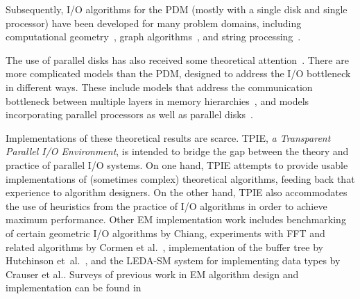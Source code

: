 Subsequently, I/O algorithms for the PDM (mostly with a
single disk and single processor) have been developed for
many problem domains, including computational
geometry~\cite{aapv-fibld-01,goodrich:external,arge:buffer,arge:theory,arge:gis,aamvv-empgbtag97,arge:interval,kanellakis:indexing,ramaswamy:path,subramanian:p-range,vengroff:efficient,agarwal:efficient,zhu:further,agarwal:point,arge:scalable,arge:theory,callahan:topology,franciosa:orders,grossi:cross-tree,arge:tpie},
 graph
algorithms~\cite{chiang:external,arge:buffer,kumar:improved,abello:functional,crauser:randomized,arge:obdd,feuerstein:memory,nodine:blocking,ullman:input},
 and string
processing~\cite{ferragina:fully,ferragina:fast,arge:strings,crauser:construction}.

The use of parallel disks
 has also received
some theoretical
attention~\cite{vitter:parmem1,nodine:deterministic,nodine:greed,dehne:efficient,dehne:reducing}.
There are more complicated models than the PDM, designed to
address the I/O bottleneck in different ways. These include
models that address the communication bottleneck between
multiple layers in
memory hierarchies~\cite{}, and models incorporating
parallel processors as well as parallel
disks~\cite{cormen:challenge,dehne:efficient,dehne:reducing}.

Implementations of these theoretical results are scarce.
TPIE, {\em a Transparent Parallel I/O Environment}, is
intended to bridge the gap between the theory and practice
of parallel I/O systems. On one hand, TPIE attempts to
provide usable implementations of (sometimes complex)
theoretical algorithms, feeding back that experience to
algorithm designers. On the other hand, TPIE also
accommodates the use of heuristics from the practice of I/O
algorithms in order to achieve maximum performance. Other EM
implementation work includes benchmarking of certain
geometric I/O algorithms by Chiang\cite{chiang:experiments},
experiments with FFT and related algorithms by Cormen et
al.~\cite{cormen:ffts}, implementation of the buffer tree
\cite{arge:buffer} by Hutchinson et~al.~\cite{hutchinson:early}, and the
LEDA-SM system for
implementing data types by Crauser et al.\cite{mehlhorn:ledasm}.  Surveys
of previous work in EM algorithm design and implementation
can be found
in~\cite{arge:gisbook,arge:thesis,vitter:dimacssurvey}

